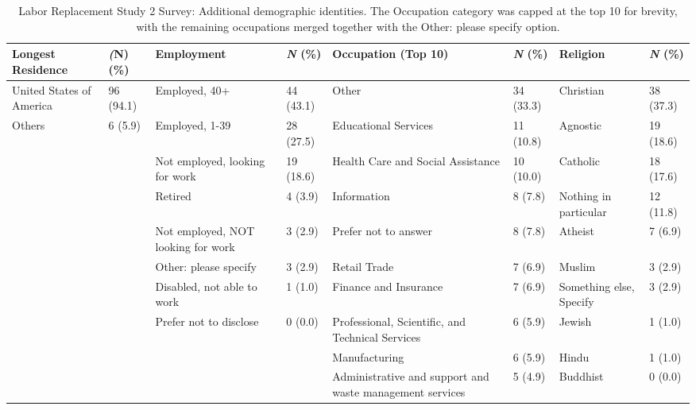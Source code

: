 \begin{table*}[htpb]
    \centering
    \footnotesize
    \begin{tabularx}{\textwidth}{Xl|Xl|Xl|Xl}
    \toprule
        \textbf{Longest Residence} & \textbf{\textit(N) (\%)} & \textbf{Employment} & \textbf{\textit{N} (\%)} & \textbf{Occupation (Top 10)} & \textbf{\textit{N} (\%)} & \textbf{Religion} & \textbf{\textit{N} (\%)} \\
    \midrule
United States of America & 96 (94.1) & Employed, 40+ & 44 (43.1) & Other & 34 (33.3) & Christian & 38 (37.3)\\
Others & 6 (5.9) & Employed, 1-39 & 28 (27.5) & Educational Services & 11 (10.8) & Agnostic & 19 (18.6)\\
 &  & Not employed, looking for work & 19 (18.6) & Health Care and Social Assistance & 10 (10.0) & Catholic & 18 (17.6)\\
 &  & Retired & 4 (3.9) & Information & 8 (7.8) & Nothing in particular & 12 (11.8)\\
 &  & Not employed, NOT looking for work & 3 (2.9) & Prefer not to answer & 8 (7.8) & Atheist & 7 (6.9)\\
 &  & Other: please specify & 3 (2.9) & Retail Trade & 7 (6.9) & Muslim & 3 (2.9)\\
 &  & Disabled, not able to work & 1 (1.0) & Finance and Insurance & 7 (6.9) & Something else, Specify & 3 (2.9)\\
 &  & Prefer not to disclose & 0 (0.0) & Professional, Scientific, and Technical Services & 6 (5.9) & Jewish & 1 (1.0)\\
 &  &  &  & Manufacturing & 6 (5.9) & Hindu & 1 (1.0)\\
 &  &  &  & Administrative and support and waste management services & 5 (4.9) & Buddhist & 0 (0.0)\\
 \bottomrule
    \end{tabularx}
    \caption{Labor Replacement Study 2 Survey: Additional demographic identities. The Occupation category was capped at the top 10 for brevity, with the remaining occupations merged together with the Other: please specify option.}
    \label{app:demographics-3-jobs-p2}
\end{table*}